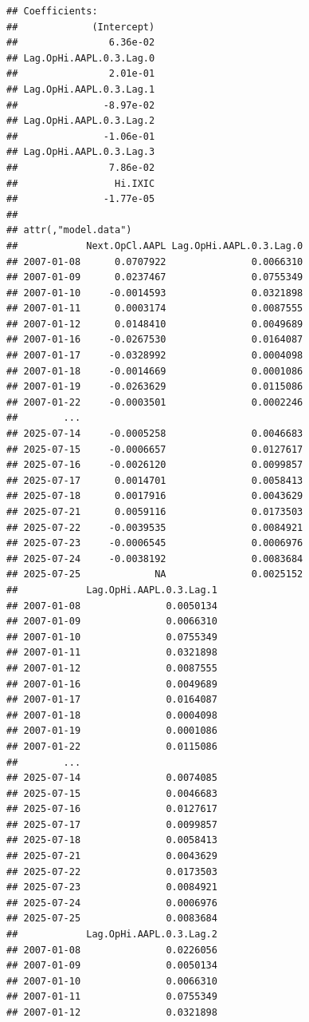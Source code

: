 \documentclass[]{ctexbook}
\begin{document}
\begin{verbatim}
## Coefficients:
##             (Intercept)  
##                6.36e-02  
## Lag.OpHi.AAPL.0.3.Lag.0  
##                2.01e-01  
## Lag.OpHi.AAPL.0.3.Lag.1  
##               -8.97e-02  
## Lag.OpHi.AAPL.0.3.Lag.2  
##               -1.06e-01  
## Lag.OpHi.AAPL.0.3.Lag.3  
##                7.86e-02  
##                 Hi.IXIC  
##               -1.77e-05  
## 
## attr(,"model.data")
##            Next.OpCl.AAPL Lag.OpHi.AAPL.0.3.Lag.0
## 2007-01-08      0.0707922               0.0066310
## 2007-01-09      0.0237467               0.0755349
## 2007-01-10     -0.0014593               0.0321898
## 2007-01-11      0.0003174               0.0087555
## 2007-01-12      0.0148410               0.0049689
## 2007-01-16     -0.0267530               0.0164087
## 2007-01-17     -0.0328992               0.0004098
## 2007-01-18     -0.0014669               0.0001086
## 2007-01-19     -0.0263629               0.0115086
## 2007-01-22     -0.0003501               0.0002246
##        ...                                       
## 2025-07-14     -0.0005258               0.0046683
## 2025-07-15     -0.0006657               0.0127617
## 2025-07-16     -0.0026120               0.0099857
## 2025-07-17      0.0014701               0.0058413
## 2025-07-18      0.0017916               0.0043629
## 2025-07-21      0.0059116               0.0173503
## 2025-07-22     -0.0039535               0.0084921
## 2025-07-23     -0.0006545               0.0006976
## 2025-07-24     -0.0038192               0.0083684
## 2025-07-25             NA               0.0025152
##            Lag.OpHi.AAPL.0.3.Lag.1
## 2007-01-08               0.0050134
## 2007-01-09               0.0066310
## 2007-01-10               0.0755349
## 2007-01-11               0.0321898
## 2007-01-12               0.0087555
## 2007-01-16               0.0049689
## 2007-01-17               0.0164087
## 2007-01-18               0.0004098
## 2007-01-19               0.0001086
## 2007-01-22               0.0115086
##        ...                        
## 2025-07-14               0.0074085
## 2025-07-15               0.0046683
## 2025-07-16               0.0127617
## 2025-07-17               0.0099857
## 2025-07-18               0.0058413
## 2025-07-21               0.0043629
## 2025-07-22               0.0173503
## 2025-07-23               0.0084921
## 2025-07-24               0.0006976
## 2025-07-25               0.0083684
##            Lag.OpHi.AAPL.0.3.Lag.2
## 2007-01-08               0.0226056
## 2007-01-09               0.0050134
## 2007-01-10               0.0066310
## 2007-01-11               0.0755349
## 2007-01-12               0.0321898

\end{verbatim}
\end{document}
